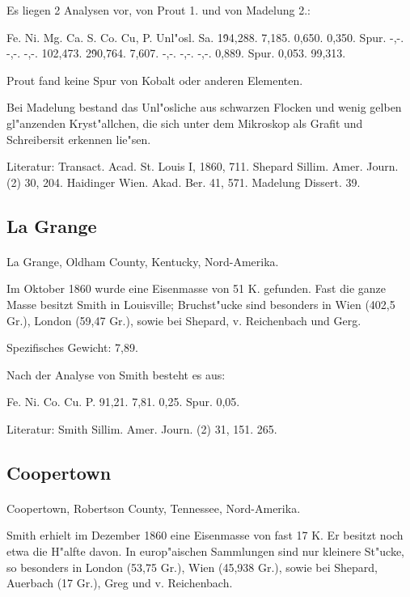 \documentclass[a4paper, 11pt, oneside]{article}
\begin{document}
Es liegen 2 Analysen vor, von Prout 1. und von Madelung 2.:

Fe. Ni. Mg. Ca. S. Co. Cu, P. Unl"osl. Sa.  
1\. 94,288. 7,185. 0,650. 0,350. Spur. -,-. -,-. -,-. 102,473.  
2\. 90,764. 7,607. -,-. -,-. -,-. 0,889. Spur. 0,053. 99,313.

Prout fand keine Spur von Kobalt oder anderen Elementen.

Bei Madelung bestand das Unl"osliche aus schwarzen Flocken und wenig gelben gl"anzenden Kryst"allchen, die sich unter dem Mikroskop als Grafit und Schreibersit erkennen lie"sen.

Literatur: Transact. Acad. St. Louis I, 1860, 711. Shepard Sillim. Amer. Journ. (2) 30, 204. Haidinger Wien. Akad. Ber. 41, 571. Madelung Dissert. 39.

\subsection{La Grange}
\normalsize
\paragraph{}
La Grange, Oldham County, Kentucky, Nord-Amerika.

Im Oktober 1860 wurde eine Eisenmasse von 51 K. gefunden. Fast die ganze Masse besitzt Smith in Louisville; Bruchst"ucke sind besonders in Wien (402,5 Gr.), London (59,47 Gr.), sowie bei Shepard, v. Reichenbach und Gerg.

Spezifisches Gewicht: 7,89.

Nach der Analyse von Smith besteht es aus:

Fe. Ni. Co. Cu. P.  
91,21. 7,81. 0,25. Spur. 0,05.

Literatur: Smith Sillim. Amer. Journ. (2) 31, 151. 265.

\subsection{Coopertown}
\normalsize
\paragraph{}
Coopertown, Robertson County, Tennessee, Nord-Amerika.

Smith erhielt im Dezember 1860 eine Eisenmasse von fast 17 K. Er besitzt noch etwa die H"alfte davon. In europ"aischen Sammlungen sind nur kleinere St"ucke, so besonders in London (53,75 Gr.), Wien (45,938 Gr.), sowie bei Shepard, Auerbach (17 Gr.), Greg und v. Reichenbach.
\end{document}
